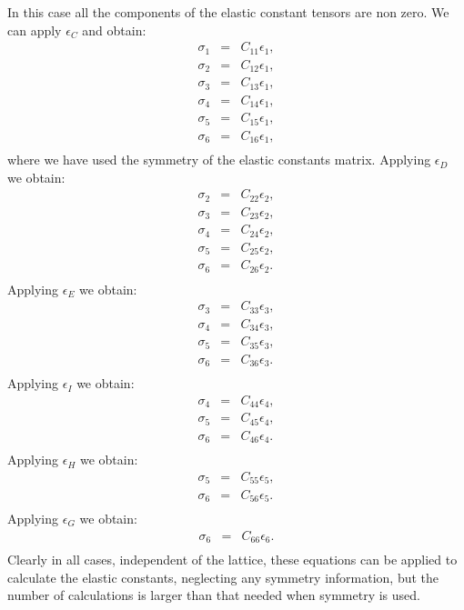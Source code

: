 \documentclass[12pt,a4paper,twoside]{report}
\begin{document}
In this case all the components of the elastic constant tensors are non zero.
We can apply $\epsilon_C$ and obtain:
\begin{eqnarray}
\sigma_1&=&C_{11} \epsilon_1,  \\
\sigma_2&=&C_{12} \epsilon_1,  \\
\sigma_3&=&C_{13} \epsilon_1,  \\
\sigma_4&=&C_{14} \epsilon_1,  \\
\sigma_5&=&C_{15} \epsilon_1,  \\
\sigma_6&=&C_{16} \epsilon_1,  \\
\end{eqnarray}
where we have used the symmetry of the elastic constants matrix.
Applying $\epsilon_D$ we obtain:
\begin{eqnarray}
\sigma_2&=&C_{22} \epsilon_2,  \\
\sigma_3&=&C_{23} \epsilon_2,  \\
\sigma_4&=&C_{24} \epsilon_2,  \\
\sigma_5&=&C_{25} \epsilon_2,  \\
\sigma_6&=&C_{26} \epsilon_2.  \\
\end{eqnarray}
Applying $\epsilon_E$ we obtain:
\begin{eqnarray}
\sigma_3&=&C_{33} \epsilon_3,  \\
\sigma_4&=&C_{34} \epsilon_3,  \\
\sigma_5&=&C_{35} \epsilon_3,  \\
\sigma_6&=&C_{36} \epsilon_3.  \\
\end{eqnarray}
Applying $\epsilon_I$ we obtain:
\begin{eqnarray}
\sigma_4&=&C_{44} \epsilon_4,  \\
\sigma_5&=&C_{45} \epsilon_4,  \\
\sigma_6&=&C_{46} \epsilon_4.  \\
\end{eqnarray}
Applying $\epsilon_H$ we obtain:
\begin{eqnarray}
\sigma_5&=&C_{55} \epsilon_5,  \\
\sigma_6&=&C_{56} \epsilon_5.  \\
\end{eqnarray}
Applying $\epsilon_G$ we obtain:
\begin{eqnarray}
\sigma_6&=&C_{66} \epsilon_6.  \\
\end{eqnarray}
Clearly in all cases, independent of the lattice, these equations can be
applied to calculate the elastic constants, neglecting any symmetry
information, but the number of calculations is larger than that needed
when symmetry is used.
\end{document}
